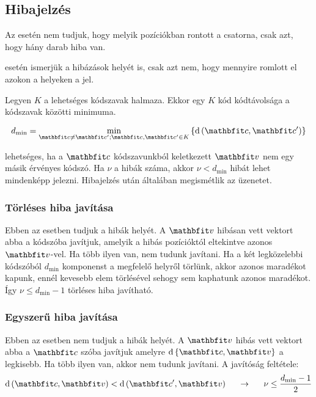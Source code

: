 \documentclass[../main.tex]{subfiles}
\begin{document}
\subsection{Hibajelzés}

Az  esetén nem tudjuk, hogy melyik pozíciókban rontott
a csatorna, csak azt, hogy hány darab hiba van.

 esetén ismerjük a hibázások helyét is, csak azt nem,
hogy mennyire romlott el azokon a helyeken a jel.

Legyen $K$ a lehetséges kódszavak halmaza. Ekkor egy $K$ kód kódtávolsága
a kódszavak közötti  minimuma.

\[
	d_\mathrm{{min}} = \min_{
		\rvec{c} \neq \rvec{c'};\rvec{c}, \rvec{c'} \in K
	} \left\{ \dist \left( \rvec{c}, \rvec{c'} \right) \right\}
\]

 lehetséges, ha a $\rvec{c}$ kódszavunkból
keletkezett $\rvec{v}$ nem egy másik érvényes kódszó. Ha $\nu$
a hibák száma, akkor $\nu < d_\mathrm{min}$ hibát lehet mindenképp
jelezni. Hibajelzés után általában megismétlik az üzenetet.

\subsubsection*{Törléses hiba javítása}

Ebben az esetben tudjuk a hibák helyét.
A $\rvec{v}$ hibásan vett vektort abba a kódszóba javítjuk,
amelyik a hibás pozícióktól eltekintve azonos $\rvec{v}$-vel.
Ha több ilyen van, nem tudunk javítani.
Ha a két legközelebbi kódszóból $d_\mathrm{min}$ komponenst
a megfelelő helyről törlünk, akkor azonos maradékot kapunk,
ennél kevesebb elem törlésével sehogy sem kaphatunk azonos
maradékot. Így $\nu \leq d_\mathrm{min} - 1$ törléses hiba javítható.

\subsubsection*{Egyszerű hiba javítása}

Ebben az esetben nem tudjuk a hibák helyét.
A $\rvec{v}$ hibás vett vektort abba a $\rvec{c}$
szóba javítjuk amelyre $\mathrm{d} \left\{
	\rvec{c}, \rvec{v}
	\right\}$ a legkisebb. Ha több ilyen van,
akkor nem tudunk javítani. A javítóság feltétele:
\begin{equation*}
	\mathrm{d} \left( \rvec{c}, \rvec{v} \right)
	< \mathrm{d} \left( \rvec{c'}, \rvec{v} \right)
	\hspace*{1.5em} \rightarrow \hspace*{1.5em}
	\nu \leq \frac{d_\mathrm{min} - 1}{2}
\end{equation*}
\end{document}
